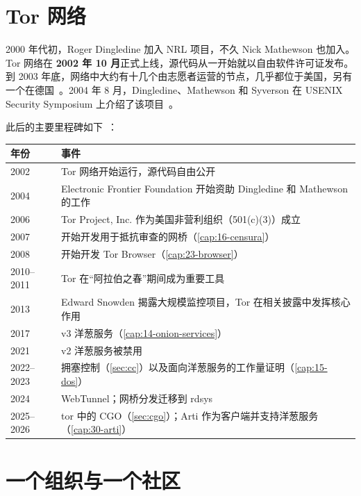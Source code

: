 \section{Tor 网络}\label{sec:nascita-rete}

2000 年代初，Roger Dingledine 加入 NRL 项目，不久 Nick Mathewson 也加入。Tor 网络在 \textbf{2002 年 10 月}正式上线，源代码从一开始就以自由软件许可证发布。到 2003 年底，网络中大约有十几个由志愿者运营的节点，几乎都位于美国，另有一个在德国~\cite{torhistory}。2004 年 8 月，Dingledine、Mathewson 和 Syverson 在 USENIX Security Symposium 上介绍了该项目~\cite{dingledine2004tor}。

此后的主要里程碑如下~\cite{torhistory}：
\begin{center}\small
\begin{tabularx}{\textwidth}{@{}l>{\raggedright\arraybackslash}X@{}}
\toprule
年份 & 事件 \\
\midrule
2002 & Tor 网络开始运行，源代码自由公开 \\
2004 & Electronic Frontier Foundation 开始资助 Dingledine 和 Mathewson 的工作 \\
2006 & Tor Project, Inc. 作为美国非营利组织（501(c)(3)）成立 \\
2007 & 开始开发用于抵抗审查的网桥（\cref{cap:16-censura}） \\
2008 & 开始开发 Tor Browser（\cref{cap:23-browser}） \\
2010--2011 & Tor 在“阿拉伯之春”期间成为重要工具 \\
2013 & Edward Snowden 揭露大规模监控项目，Tor 在相关披露中发挥核心作用 \\
2017 & v3 洋葱服务（\cref{cap:14-onion-services}） \\
2021 & v2 洋葱服务被禁用 \\
2022--2023 & 拥塞控制（\cref{sec:cc}）以及面向洋葱服务的工作量证明（\cref{cap:15-dos}） \\
2024 & WebTunnel；网桥分发迁移到 rdsys \\
2025--2026 & tor 中的 CGO（\cref{sec:cgo}）；Arti 作为客户端并支持洋葱服务（\cref{cap:30-arti}） \\
\bottomrule
\end{tabularx}
\end{center}

\section{一个组织与一个社区}\label{sec:nascita-comunita}


